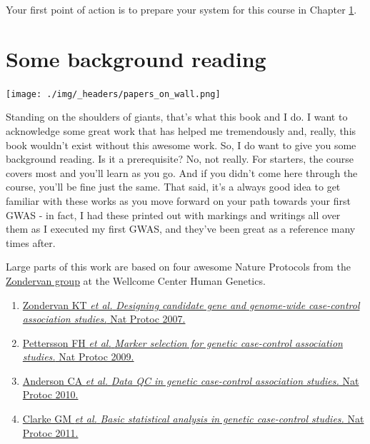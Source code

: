 \documentclass[
]{book}
\providecommand{\tightlist}{%
  \setlength{\itemsep}{0pt}\setlength{\parskip}{0pt}}
\begin{document}
Your first point of action is to prepare your system for this course in Chapter \ref{somebackgroundreading}.

\hypertarget{somebackgroundreading}{%
\chapter{Some background reading}\label{somebackgroundreading}}

\texttt{[image: ./img/\_headers/papers\_on\_wall.png]}

Standing on the shoulders of giants, that's what this book and I do. I want to acknowledge some great work that has helped me tremendously and, really, this book wouldn't exist without this awesome work. So, I do want to give you some background reading. Is it a prerequisite? No, not really. For starters, the course covers most and you'll learn as you go. And if you didn't come here through the course, you'll be fine just the same. That said, it's a always good idea to get familiar with these works as you move forward on your path towards your first GWAS - in fact, I had these printed out with markings and writings all over them as I executed my first GWAS, and they've been great as a reference many times after.

Large parts of this work are based on four awesome Nature Protocols from the \href{https://www.well.ox.ac.uk/research/research-groups/zondervan-group}{Zondervan group} at the Wellcome Center Human Genetics.

\begin{enumerate}
\def\labelenumi{\arabic{enumi}.}
\tightlist
\item
  \href{https://www.ncbi.nlm.nih.gov/pubmed/17947991}{Zondervan KT \emph{et al.} \emph{Designing candidate gene and genome-wide case-control association studies.} Nat Protoc 2007.}
\item
  \href{https://www.ncbi.nlm.nih.gov/pubmed/19390530}{Pettersson FH \emph{et al.} \emph{Marker selection for genetic case-control association studies.} Nat Protoc 2009.}
\item
  \href{https://www.ncbi.nlm.nih.gov/pubmed/21085122}{Anderson CA \emph{et al.} \emph{Data QC in genetic case-control association studies.} Nat Protoc 2010.}
\item
  \href{https://www.ncbi.nlm.nih.gov/pubmed/21293453}{Clarke GM \emph{et al.} \emph{Basic statistical analysis in genetic case-control studies.} Nat Protoc 2011.}
\end{enumerate}
\end{document}
